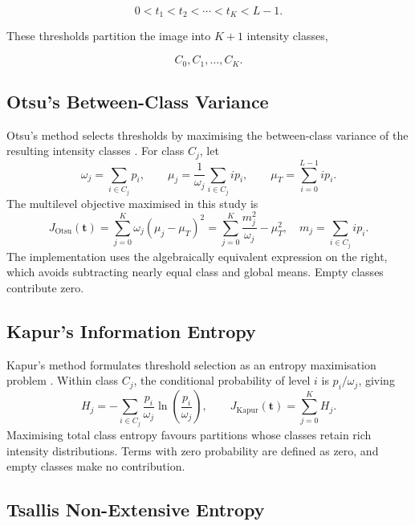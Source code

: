 \documentclass[review,authoryear]{elsarticle}
\begin{document}
\begin{equation}
0 < t_1 < t_2 < \cdots < t_K < L-1.
\end{equation}

These thresholds partition the image into $K+1$ intensity classes,

\begin{equation}
C_0,C_1,\ldots,C_K.
\end{equation}


\subsection{Otsu's Between-Class Variance}
\label{sec:otsu}

Otsu's method selects thresholds by maximising the between-class
variance of the resulting intensity classes \citep{otsu1979threshold}.
For class $C_j$, let
\begin{equation}
\omega_j=\sum_{i\in C_j}p_i,
\qquad
\mu_j=\frac{1}{\omega_j}\sum_{i\in C_j}i p_i,
\qquad
\mu_T=\sum_{i=0}^{L-1}i p_i.
\end{equation}
The multilevel objective maximised in this study is
\begin{equation}
J_{\mathrm{Otsu}}(\mathbf{t})
=\sum_{j=0}^{K}\omega_j(\mu_j-\mu_T)^2
=\sum_{j=0}^{K}\frac{m_j^2}{\omega_j}-\mu_T^2,
\quad m_j=\sum_{i\in C_j}i p_i.
\end{equation}
The implementation uses the algebraically equivalent expression on the
right, which avoids subtracting nearly equal class and global means. Empty
classes contribute zero.


\subsection{Kapur's Information Entropy}
\label{sec:kapur}

Kapur's method formulates threshold selection as an entropy maximisation
problem \citep{kapur1985entropy}. Within class $C_j$, the conditional
probability of level $i$ is $p_i/\omega_j$, giving
\begin{equation}
H_j=-\sum_{i\in C_j}\frac{p_i}{\omega_j}
\ln\left(\frac{p_i}{\omega_j}\right),
\qquad
J_{\mathrm{Kapur}}(\mathbf{t})=\sum_{j=0}^{K}H_j.
\end{equation}
Maximising total class entropy favours partitions whose classes retain rich
intensity distributions. Terms with zero probability are defined as zero,
and empty classes make no contribution.


\subsection{Tsallis Non-Extensive Entropy}
\label{sec:tsallis}
\end{document}
